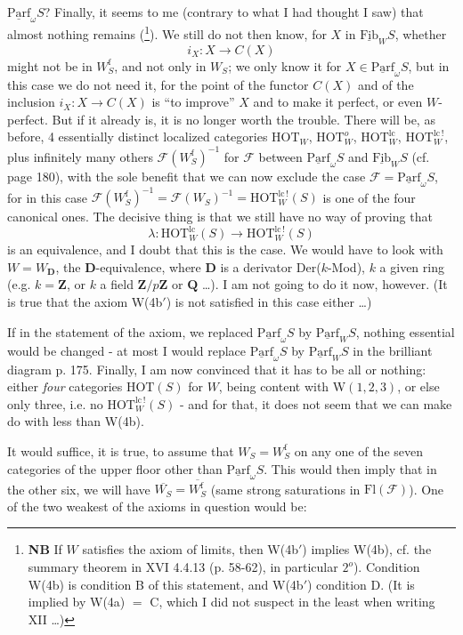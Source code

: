 \documentclass[11pt]{article}
\newcommand{\printedpage}[1]{\marginpar{\footnotesize p.~#1}}
\newcommand{\msp}[1]{\marginpar{\footnotesize [#1]}}
\newcommand{\Parf}{\underline{\mathrm{Parf}}}
\newcommand{\Fib}{\underline{\mathrm{Fib}}}
\newcommand{\HOT}{\mathrm{HOT}}
\begin{document}
\printedpage{114}

$\Parf_\omega S$? Finally, it seems to me (contrary to what I had thought I saw) that almost nothing remains (\footnote{\textbf{NB} If $W$ satisfies the axiom of limits, then W(4b$'$) implies W(4b), cf. the summary theorem in XVI 4.4.13 (p. 58-62), in particular $2^{o}$). Condition W(4b) is condition B of this statement, and W(4b$'$) condition D. (It is implied by W(4a) $=$ C, which I did not suspect in the least when writing XII \dots)}). We still do not then know, for $X$ in $\Fib_W S$, whether
\[ i_X : X \longrightarrow C(X) \]
might not be in $W^{\mathrm{f}}_S$, and not only in $W_S$; we only know it for $X \in \Parf_\omega S$, but in this case we do not need it, for the point of the functor $C(X)$ and of the inclusion $i_X : X \longrightarrow C(X)$ is ``to improve'' $X$ and to make it perfect, or even $W$-perfect. But if it already is, it is no longer worth the trouble. There will be, as
\msp{page 184}
before, 4 essentially distinct localized categories $\HOT_W$, $\HOT^{o}_W$, $\HOT^{\mathrm{lc}}_W$, $\HOT^{\mathrm{lc}\,!}_W$, plus infinitely many others $\mathcal{F}(W^{\mathrm{f}}_S)^{-1}$ for $\mathcal{F}$ between $\Parf_\omega S$ and $\Fib_W S$ (cf. page 180), with the sole benefit that we can now exclude the case $\mathcal{F} = \Parf_\omega S$, for in this case $\mathcal{F}(W^{\mathrm{f}}_S)^{-1} = \mathcal{F}(W_S)^{-1} = \HOT^{\mathrm{lc}\,!}_W(S)$ is one of the four canonical ones. The decisive thing is that we still have no way of proving that
\[ \lambda : \HOT^{\mathrm{lc}}_W(S) \longrightarrow \HOT^{\mathrm{lc}\,!}_W(S) \]
is an equivalence, and I doubt that this is the case. We would have to look with $W = W_{\mathbf{D}}$, the $\mathbf{D}$-equivalence, where $\mathbf{D}$ is a derivator Der($k$-Mod), $k$ a given ring (e.g. $k = \mathbf{Z}$, or $k$ a field $\mathbf{Z}/p\mathbf{Z}$ or $\mathbf{Q}$ \dots). I am not going to do it now, however. (It is true that the axiom W(4b$'$) is not satisfied in this case either \dots)

If in the statement of the axiom, we replaced $\Parf_\omega S$ by $\Parf_W S$, nothing essential would be changed - at most I would replace $\Parf_\omega S$ by $\Parf_W S$ in the brilliant diagram p. 175. Finally, I am now convinced that it has to be all or nothing: either \textit{four} categories $\HOT(S)$ for $W$, being content with W$(1,2,3)$, or else only three, i.e. no $\HOT^{\mathrm{lc}\,!}_W(S)$ - and for that, it does not seem that we can make do with less than W(4b).

\msp{page 185}
It would suffice, it is true, to assume that $W_S = W^{\mathrm{f}}_S$ on any one of the seven categories of the upper floor other than $\Parf_\omega S$. This would then imply that in the other six, we will have $\overline{W_S} = \overline{W^{\mathrm{f}}_S}$ (same strong saturations in $\mathrm{Fl}(\mathcal{F})$). One of the two weakest of the axioms in question would be: %
\end{document}
